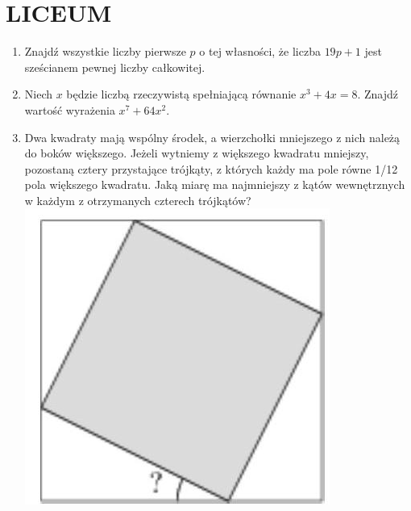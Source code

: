 \documentclass[10pt]{article}
\begin{document}
\section*{LICEUM}
\begin{enumerate}
  \item Znajdź wszystkie liczby pierwsze \(p\) o tej własności, że liczba \(19 p+1\) jest sześcianem pewnej liczby całkowitej.
  \item Niech \(x\) będzie liczbą rzeczywistą spełniającą równanie \(x^{3}+4 x=8\). Znajdź wartość wyrażenia \(x^{7}+64 x^{2}\).
  \item Dwa kwadraty mają wspólny środek, a wierzchołki mniejszego z nich należą do boków większego. Jeżeli wytniemy z większego kwadratu mniejszy, pozostaną cztery przystające trójkąty, z których każdy ma pole równe 1/12 pola większego kwadratu. Jaką miarę ma najmniejszy z kątów wewnętrznych w każdym z otrzymanych czterech trójkątów?\\
\includegraphics[max width=\textwidth, center]{2024_11_21_380bde68f8bdcfb12cb9g-1(1)}
\end{enumerate}
\end{document}
